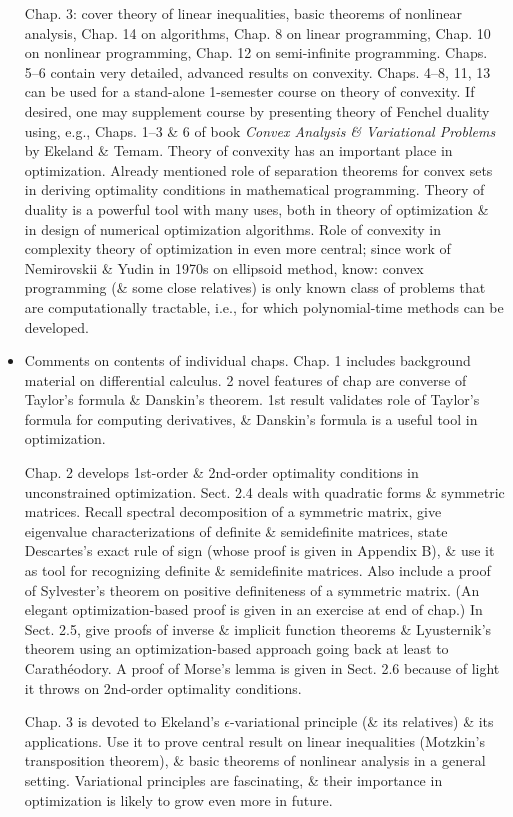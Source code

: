 \documentclass{article}
\begin{document}
\begin{itemize}
    Chap. 3: cover theory of linear inequalities, basic theorems of nonlinear analysis, Chap. 14 on algorithms, Chap. 8 on linear programming, Chap. 10 on nonlinear programming, Chap. 12 on semi-infinite programming. Chaps. 5--6 contain very detailed, advanced results on convexity. Chaps. 4--8, 11, 13 can be used for a stand-alone 1-semester course on theory of convexity. If desired, one may supplement course by presenting theory of Fenchel duality using, e.g., Chaps. 1--3 \& 6 of book {\it Convex Analysis \& Variational Problems} by {\sc Ekeland \& Temam}. Theory of convexity has an important place in optimization. Already mentioned role of separation theorems for convex sets in deriving optimality conditions in mathematical programming. Theory of duality is a powerful tool with many uses, both in theory of optimization \& in design of numerical optimization algorithms. Role of convexity in complexity theory of optimization in even more central; since work of {\sc Nemirovskii \& Yudin} in 1970s on ellipsoid method, know: convex programming (\& some close relatives) is only known class of problems that are computationally tractable, i.e., for which polynomial-time methods can be developed.
    \item {\sf Comments on contents of individual chaps.} Chap. 1 includes background material on differential calculus. 2 novel features of chap are converse of Taylor's formula \& Danskin's theorem. 1st result validates role of Taylor's formula for computing derivatives, \& Danskin's formula is a useful tool in optimization.

    Chap. 2 develops 1st-order \& 2nd-order optimality conditions in unconstrained optimization. Sect. 2.4 deals with quadratic forms \& symmetric matrices. Recall spectral decomposition of a symmetric matrix, give eigenvalue characterizations of definite \& semidefinite matrices, state Descartes's exact rule of sign (whose proof is given in Appendix B), \& use it as tool for recognizing definite \& semidefinite matrices. Also include a proof of Sylvester's theorem on positive definiteness of a symmetric matrix. (An elegant optimization-based proof is given in an exercise at end of chap.) In Sect. 2.5, give proofs of inverse \& implicit function theorems \& Lyusternik's theorem using an optimization-based approach going back at least to Carathéodory. A proof of Morse's lemma is given in Sect. 2.6 because of light it throws on 2nd-order optimality conditions.

    Chap. 3 is devoted to Ekeland's $\epsilon$-variational principle (\& its relatives) \& its applications. Use it to prove central result on linear inequalities (Motzkin's transposition theorem), \& basic theorems of nonlinear analysis in a general setting. Variational principles are fascinating, \& their importance in optimization is likely to grow even more in future.


\end{itemize}
\end{document}
